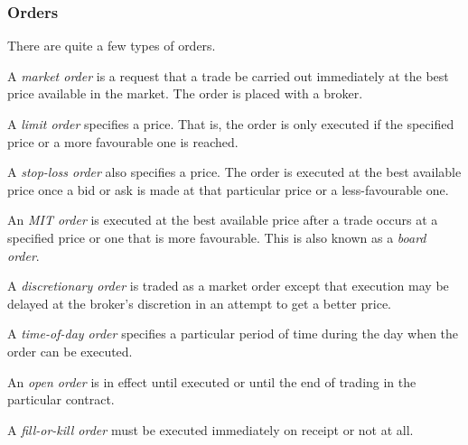 \subsubsection*{Orders}
\bigskip

\begin{definition*}
    There are quite a few types of orders.
    \begin{definition}
        A \emph{market order} is a request that a trade be carried out immediately at the best price available in the market. The order is placed with a broker.
    \end{definition}
    \begin{definition}
        A \emph{limit order} specifies a price. That is, the order is only executed if the specified price or a more favourable one is reached.
    \end{definition}
    \begin{definition}
        A \emph{stop-loss order} also specifies a price. The order is executed
        at the best available price once a bid or ask is made at that particular price or a less-favourable one.
    \end{definition}
    \begin{definition}
        An \emph{MIT order} is executed at the best available price after a trade occurs at a specified price or one that is more favourable. This is also known as a \emph{board order}.
    \end{definition}
    \begin{definition}
        A \emph{discretionary order} is traded as a market order except that  execution may be delayed at the broker's discretion in an attempt to get a better price.
    \end{definition}
    \begin{definition}
        A \emph{time-of-day order} specifies a particular period of time during the day when the order can be executed.
    \end{definition}
    \begin{definition}
        An \emph{open order} is in effect until executed or until the end of trading in the particular contract. 
    \end{definition}
    \begin{definition}
        A \emph{fill-or-kill order} must be executed immediately on receipt or not at all.
    \end{definition}
\end{definition*}

